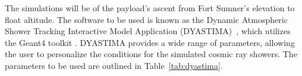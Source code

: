 The simulations will be of the payload's ascent from Fort Sumner's elevation to float altitude. The software to be used is known as the Dynamic Atmospheric Shower Tracking Interactive Model Application (DYASTIMA)~\cite{dyastima}, which utilizes the Geant4 toolkit \cite{geant4}. DYASTIMA provides a wide range of parameters, allowing the user to personalize the conditions for the simulated cosmic ray showers. The parameters to be used are outlined in Table~\ref{tab:dyastima}.

